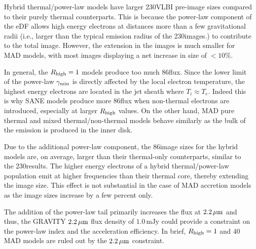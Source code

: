 Hybrid thermal/power-law models have larger 230\GHz VLBI pre-image sizes compared to their purely thermal counterparts.
This is because the power-law component of the eDF allows high energy electrons at distances more than a few gravitational radii (i.e., larger than the typical emission radius of the 230\GHz images.) to contribute to the total image.
However, the extension in the images is much smaller for MAD models, with most images displaying a net increase in size of $<10\%$.


In general, the $R_{\rm high}=1$ models produce too much 86\GHz flux.
Since the lower limit of the power-law $\gamma_{\rm min}$ is directly affected by the local electron temperature, the highest energy electrons are located in the jet sheath where $T_i \approx T_e$.
Indeed this is why SANE models produce more 86\GHz flux when non-thermal electrons are introduced, especially at larger $R_\mathrm{high}$ values.
On the other hand, MAD pure thermal and mixed thermal/non-thermal models behave similarly as the bulk of the emission is produced in the inner disk.

Due to the additional power-law component, the 86\GHz image sizes for the hybrid \hamr models are, on average, larger than their thermal-only counterparts, similar to the 230\GHz results.
The higher energy electrons of a hybrid thermal/power-law population emit at higher frequencies than their thermal core, thereby extending the image size.
This effect is not substantial in the case of MAD accretion models as the image sizes increase by a few percent only.


The addition of the power-law tail primarily increases the flux at $2.2\,\mu\mathrm{m}$ and thus, the GRAVITY $2.2\,\mu\mathrm{m}$ flux density of $1.0\,\mathrm{mJy}$ could provide a constraint on the power-law index and the acceleration efficiency.
In brief, $R_\mathrm{high}=1$ and $40$ MAD models are ruled out by the $2.2\,\mu\mathrm{m}$ constraint.



